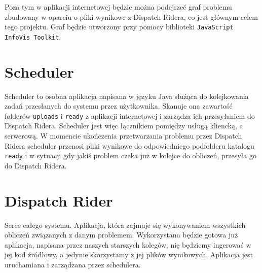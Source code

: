 Poza tym w aplikacji internetowej będzie można podejrzeć graf problemu zbudowany w oparciu o pliki
wynikowe z Dispatch Ridera, co jest głównym celem tego projektu. Graf będzie utworzony przy pomocy
biblioteki \texttt{JavaScript InfoVis Toolkit}.

\section{Scheduler}
Scheduler to osobna aplikacja napisana w języku Java służąca do kolejkowania zadań przesłanych do systemu
przez użytkownika. Skanuje ona zawartość folderów \texttt{uploads} i \texttt{ready} z aplikacji internetowej
i zarządza ich przesyłaniem do Dispatch Ridera. Scheduler jest więc łącznikiem pomiędzy usługą kliencką,
a serwerową. W momencie ukończenia przetwarzania problemu przez Dispatch Ridera scheduler przenosi pliki
wynikowe do odpowiedniego podfolderu katalogu \texttt{ready} i w sytuacji gdy jakiś problem czeka już w kolejce
do obliczeń, przesyła go do Dispatch Ridera.

\section{Dispatch Rider}
Serce całego systemu. Aplikacja, która zajmuje się wykonywaniem wszystkich obliczeń związanych z danym problemem.
Wykorzystana będzie gotowa już aplikacja, napisana przez naszych starszych kolegów, nię będziemy
ingerować w jej kod źródłowy, a jedynie skorzystamy z jej plików wynikowych. Aplikacja jest uruchamiana i zarządzana przez schedulera.